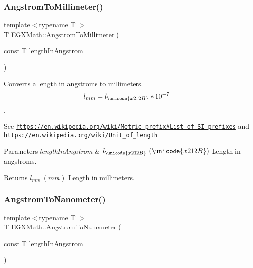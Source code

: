 \subsubsection{\texorpdfstring{Angstrom\+To\+Millimeter()}{AngstromToMillimeter()}}
{\footnotesize\ttfamily template$<$typename T $>$ \\
T E\+G\+X\+Math\+::\+Angstrom\+To\+Millimeter (\begin{DoxyParamCaption}\item[{const T}]{length\+In\+Angstrom }\end{DoxyParamCaption})}



Converts a length in angstroms to millimeters. \[ l_{mm}=l_{\unicode{x212B}} * 10^{-7} \]. 

See \href{https://en.wikipedia.org/wiki/Metric_prefix#List_of_SI_prefixes}{\tt https\+://en.\+wikipedia.\+org/wiki/\+Metric\+\_\+prefix\#\+List\+\_\+of\+\_\+\+S\+I\+\_\+prefixes} and \href{https://en.wikipedia.org/wiki/Unit_of_length}{\tt https\+://en.\+wikipedia.\+org/wiki/\+Unit\+\_\+of\+\_\+length} 
\begin{DoxyParams}{Parameters}
{\em length\+In\+Angstrom} & $ l_{\unicode{x212B}}\ (\unicode{x212B})$ Length in angstroms. \\
\hline
\end{DoxyParams}
\begin{DoxyReturn}{Returns}
$ l_{mm}\ (mm)$ Length in millimeters. 
\end{DoxyReturn}
\mbox{\label{group___e_g_x_math-_conversions-_length_conversions-_non-_s_i-_angstrom-_s_i_ga2b95587436f6db9aa13e6071769058e0}} 
\subsubsection{\texorpdfstring{Angstrom\+To\+Nanometer()}{AngstromToNanometer()}}
{\footnotesize\ttfamily template$<$typename T $>$ \\
T E\+G\+X\+Math\+::\+Angstrom\+To\+Nanometer (\begin{DoxyParamCaption}\item[{const T}]{length\+In\+Angstrom }\end{DoxyParamCaption})}



